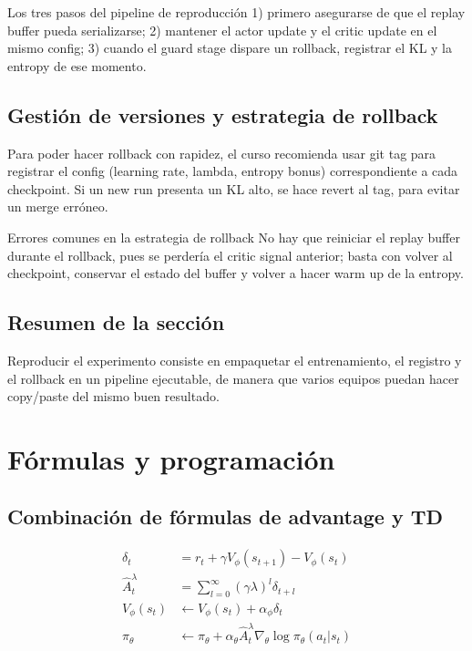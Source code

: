 \documentclass[a4paper]{article}
\begin{document}
\begin{importantbox}{Los tres pasos del pipeline de reproducción}
1) primero asegurarse de que el replay buffer pueda serializarse; 2) mantener el actor update y el critic update en el mismo config; 3) cuando el guard stage dispare un rollback, registrar el KL y la entropy de ese momento.
\end{importantbox}

\subsection{Gestión de versiones y estrategia de rollback}

Para poder hacer rollback con rapidez, el curso recomienda usar git tag para registrar el config (learning rate, lambda, entropy bonus) correspondiente a cada checkpoint. Si un new run presenta un KL alto, se hace revert al tag, para evitar un merge erróneo.

\begin{warningbox}{Errores comunes en la estrategia de rollback}
No hay que reiniciar el replay buffer durante el rollback, pues se perdería el critic signal anterior; basta con volver al checkpoint, conservar el estado del buffer y volver a hacer warm up de la entropy.
\end{warningbox}

\subsection{Resumen de la sección}

Reproducir el experimento consiste en empaquetar el entrenamiento, el registro y el rollback en un pipeline ejecutable, de manera que varios equipos puedan hacer copy/paste del mismo buen resultado.

\section{Fórmulas y programación}

\subsection{Combinación de fórmulas de advantage y TD}

\begin{align*}
\delta_t &= r_t + \gamma V_{\phi}(s_{t+1}) - V_{\phi}(s_t) \\
\hat{A}_t^{\lambda} &= \sum_{l=0}^{\infty} (\gamma \lambda)^l \delta_{t+l} \\
V_{\phi}(s_t) &\leftarrow V_{\phi}(s_t) + \alpha_\phi \delta_t \\
\pi_\theta &\leftarrow \pi_\theta + \alpha_\theta \hat{A}_t^{\lambda} \nabla_\theta \log \pi_\theta(a_t|s_t)
\end{align*}
\end{document}
